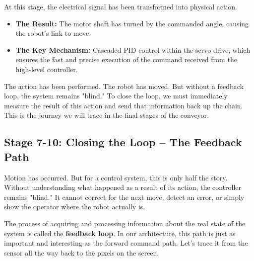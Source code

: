At this stage, the electrical signal has been transformed into physical action.
\begin{itemize}
    \item \textbf{The Result:} The motor shaft has turned by the commanded angle, causing the robot's link to move.
    \item \textbf{The Key Mechanism:} Cascaded PID control within the servo drive, which ensures the fast and precise execution of the command received from the high-level controller.
\end{itemize}

The action has been performed. The robot has moved. But without a feedback loop, the system remains "blind." To close the loop, we must immediately measure the result of this action and send that information back up the chain. This is the journey we will trace in the final stages of the conveyor.










\subsection{Stage 7-10: Closing the Loop – The Feedback Path}
\label{subsec:stage7_10_feedback}

Motion has occurred. But for a control system, this is only half the story. Without understanding what happened as a result of its action, the controller remains "blind." It cannot correct for the next move, detect an error, or simply show the operator where the robot actually is.

The process of acquiring and processing information about the real state of the system is called the \textbf{feedback loop}. In our architecture, this path is just as important and interesting as the forward command path. Let's trace it from the sensor all the way back to the pixels on the screen.

